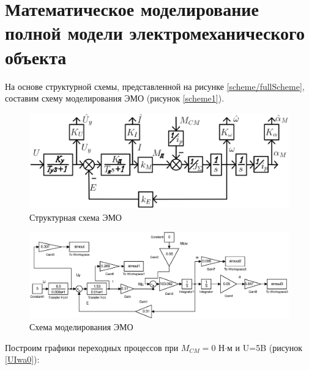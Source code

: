 \documentclass[a4paper,12pt]{article} %
\begin{document}
\section{Математическое моделирование полной модели электромеханического объекта}	 
На основе структурной схемы, представленной на рисунке \ref{scheme/fullScheme}, составим схему моделирования ЭМО (рисунок \ref{scheme1}).
\begin{figure}[ht!]
	\centering
	\includegraphics[width = \textwidth]{scheme/fullScheme}
	\caption{Структурная схема ЭМО}
	\label{fullScheme}
\end{figure}
\begin{figure}[ht!]
	\centering
	\includegraphics[width = \textwidth]{scheme/scheme1}
	\caption{Схема моделирования ЭМО}
	\label{cxema1}
\end{figure}
\par
Построим графики переходных процессов при $M_{CM}=0$ Н$\cdot$м и U=5B (рисунок \ref{UIwa0}):
\end{document}
